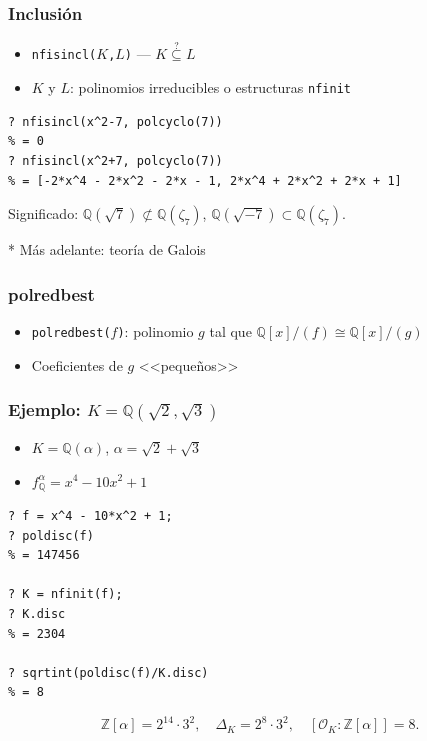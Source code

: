 \documentclass{beamer}
\newcommand{\ZZ}{\mathbb{Z}}
\newcommand{\QQ}{\mathbb{Q}}
\renewcommand{\O}{\mathcal{O}}
\begin{document}
\begin{frame}[fragile]
  \frametitle{Inclusión}
  \begin{itemize}
  \item \texttt{nfisincl($K$,$L$)} --- $K \stackrel{?}{\subseteq} L$
  \item $K$ y $L$: polinomios irreducibles o estructuras \texttt{nfinit}
  \end{itemize}

  \begin{shaded}\footnotesize
\begin{verbatim}
? nfisincl(x^2-7, polcyclo(7))
% = 0
? nfisincl(x^2+7, polcyclo(7))
% = [-2*x^4 - 2*x^2 - 2*x - 1, 2*x^4 + 2*x^2 + 2*x + 1]
\end{verbatim}
  \end{shaded}

  Significado: $\QQ (\sqrt{7}) \not\subset \QQ (\zeta_7)$,
  $\QQ (\sqrt{-7}) \subset \QQ (\zeta_7)$.

  \vspace{\fill}

  * Más adelante: teoría de Galois
\end{frame}


\begin{frame}[fragile]
  \frametitle{polredbest}

  \begin{itemize}
  \item \texttt{polredbest($f$)}: polinomio $g$ tal que
    $\QQ[x]/(f) \cong \QQ[x]/(g)$

  \item Coeficientes de $g$ <<pequeños>>
  \end{itemize}
\end{frame}


\begin{frame}[fragile]
  \frametitle{Ejemplo: $K = \QQ (\sqrt{2},\sqrt{3})$}

  \begin{itemize}
  \item $K = \QQ (\alpha)$, $\alpha = \sqrt{2} + \sqrt{3}$

  \item $f^\alpha_\QQ = x^4 - 10 x^2 + 1$
  \end{itemize}

  \begin{shaded}\footnotesize
\begin{verbatim}
? f = x^4 - 10*x^2 + 1;
? poldisc(f)
% = 147456

? K = nfinit(f);
? K.disc 
% = 2304

? sqrtint(poldisc(f)/K.disc)
% = 8
\end{verbatim}
  \end{shaded}

  \[ \ZZ [\alpha] = 2^{14}\cdot 3^2, \quad
     \Delta_K = 2^8\cdot 3^2, \quad
     [\O_K : \ZZ [\alpha]] = 8. \]
\end{frame}
\end{document}
